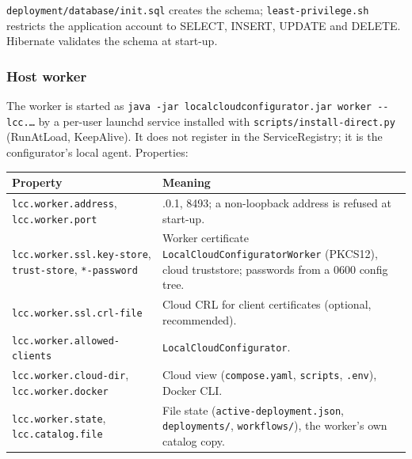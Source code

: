 \documentclass[a4paper]{arrowhead}
\begin{document}
\texttt{deployment/\allowbreak{}database/\allowbreak{}init.\allowbreak{}sql} creates the schema; \texttt{least-\allowbreak{}privilege.\allowbreak{}sh} restricts the application account to SELECT, INSERT, UPDATE and DELETE. Hibernate validates the schema at start-up.

\subsubsection{Host worker}

The worker is started as \texttt{java -jar localcloudconfigurator.jar worker -{}-lcc.\ldots} by a per-user launchd service installed with \texttt{scripts/\allowbreak{}install-\allowbreak{}direct.\allowbreak{}py} (RunAtLoad, KeepAlive). It does not register in the ServiceRegistry; it is the configurator's local agent. Properties:

\noindent\begin{longtable}{| >{\raggedright\arraybackslash}p{5.4cm} | >{\raggedright\arraybackslash}p{9.8cm} |} \hline
\rowcolor{gray!33} Property & Meaning \\ \hline \endhead
\texttt{lcc.\allowbreak{}worker.\allowbreak{}address}, \texttt{lcc.\allowbreak{}worker.\allowbreak{}port} & 127.0.0.1, 8493; a non-loopback address is refused at start-up. \\ \hline
\texttt{lcc.\allowbreak{}worker.\allowbreak{}ssl.\allowbreak{}key-\allowbreak{}store}, \texttt{trust-\allowbreak{}store}, \texttt{*-\allowbreak{}password} & Worker certificate \texttt{LocalCloudConfiguratorWorker} (PKCS12), cloud truststore; passwords from a 0600 config tree. \\ \hline
\texttt{lcc.\allowbreak{}worker.\allowbreak{}ssl.\allowbreak{}crl-\allowbreak{}file} & Cloud CRL for client certificates (optional, recommended). \\ \hline
\texttt{lcc.\allowbreak{}worker.\allowbreak{}allowed-\allowbreak{}clients} & \texttt{LocalCloudConfigurator}. \\ \hline
\texttt{lcc.\allowbreak{}worker.\allowbreak{}cloud-\allowbreak{}dir}, \texttt{lcc.\allowbreak{}worker.\allowbreak{}docker} & Cloud view (\texttt{compose.\allowbreak{}yaml}, \texttt{scripts}, \texttt{.env}), Docker CLI. \\ \hline
\texttt{lcc.\allowbreak{}worker.\allowbreak{}state}, \texttt{lcc.\allowbreak{}catalog.\allowbreak{}file} & File state (\texttt{active-\allowbreak{}deployment.\allowbreak{}json}, \texttt{deployments/}, \texttt{workflows/}), the worker's own catalog copy. \\ \hline
\end{longtable}
\end{document}
